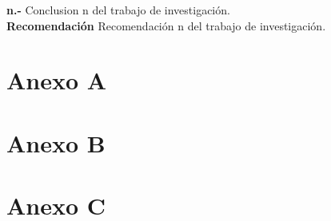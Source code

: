 \documentclass[oneside,11pt]{Latex/Classes/PhDthesisPSnPDF}
\begin{document}
\textbf{n.-} Conclusion n del trabajo de investigación.\\

\textbf{Recomendación} Recomendación n del trabajo de investigación.\\

\appendix
\renewcommand{\thechapter}{\Alph{chapter}}

\chapter{Anexo A}

\chapter{Anexo B}

\chapter{Anexo C}

\renewcommand{\bibname}{Lista de Referencias}
 
 

\end{document}
